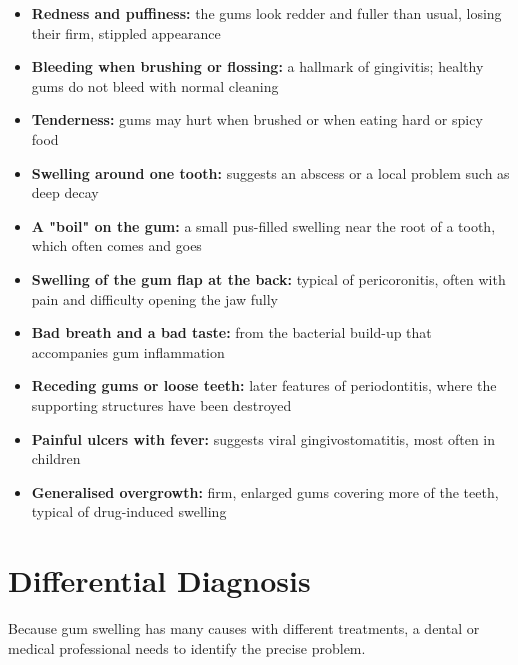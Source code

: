\begin{itemize}
    \item \textbf{Redness and puffiness:} the gums look redder and fuller than usual, losing their firm, stippled appearance
    \item \textbf{Bleeding when brushing or flossing:} a hallmark of gingivitis; healthy gums do not bleed with normal cleaning
    \item \textbf{Tenderness:} gums may hurt when brushed or when eating hard or spicy food
    \item \textbf{Swelling around one tooth:} suggests an abscess or a local problem such as deep decay
    \item \textbf{A "boil" on the gum:} a small pus-filled swelling near the root of a tooth, which often comes and goes
    \item \textbf{Swelling of the gum flap at the back:} typical of pericoronitis, often with pain and difficulty opening the jaw fully
    \item \textbf{Bad breath and a bad taste:} from the bacterial build-up that accompanies gum inflammation
    \item \textbf{Receding gums or loose teeth:} later features of periodontitis, where the supporting structures have been destroyed
    \item \textbf{Painful ulcers with fever:} suggests viral gingivostomatitis, most often in children
    \item \textbf{Generalised overgrowth:} firm, enlarged gums covering more of the teeth, typical of drug-induced swelling
\end{itemize}

\section*{Differential Diagnosis}
Because gum swelling has many causes with different treatments, a dental or medical professional needs to identify the precise problem.

